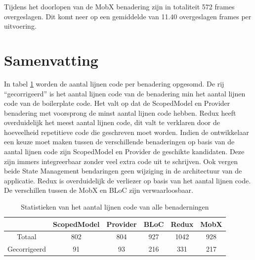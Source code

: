 Tijdens het doorlopen van de MobX benadering zijn in totaliteit 572 frames overgeslagen. Dit komt neer op een gemiddelde van 11.40 overgeslagen frames per uitvoering.

\section{Samenvatting}
In tabel \ref{table:amount-lines-of-code} worden de aantal lijnen code per benadering opgesomd. De rij ``gecorrigeerd'' is het aantal lijnen code van de benadering min het aantal lijnen code van de boilerplate code. Het valt op dat de ScopedModel en Provider benadering met voorsprong de minst aantal lijnen code hebben. Redux heeft overduidelijk het meest aantal lijnen code, dit valt te verklaren door de hoeveelheid repetitieve code die geschreven moet worden. \newline \newline
Indien de ontwikkelaar een keuze moet maken tussen de verschillende benaderingen op basis van de aantal lijnen code zijn ScopedModel en Provider de geschikte kandidaten. Deze zijn immers integreerbaar zonder veel extra code uit te schrijven. Ook vergen beide State Management bendaringen geen wijziging in de architectuur van de applicatie. \newline
Redux is overduidelijk de verliezer op basis van het aantal lijnen code. De verschillen tussen de MobX en BLoC zijn verwaarloosbaar.
\begin{table}[H]
    \centering
    \begin{tabular}{c|c|c|c|c|c}
        & \textbf{ScopedModel} & \textbf{Provider} & \textbf{BLoC} & \textbf{Redux} & \textbf{MobX} \\ \hline
        Totaal               & 802   &  804     &  927     &  1042    &  928        \\ \hline
        Gecorrigeerd         & 91    &  93      &  216     &  331     &  217
    \end{tabular}
    \caption{Statistieken van het aantal lijnen code van alle benaderningen}
    \label{table:amount-lines-of-code}
\end{table}

